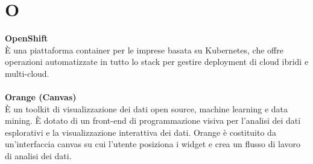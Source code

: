 \section{O}
\textbf{OpenShift}\\
È una piattaforma container per le imprese basata su Kubernetes, che offre operazioni automatizzate in tutto lo stack per gestire deployment di cloud ibridi e multi-cloud. \\ \\
\textbf{Orange (Canvas)}\\
È un toolkit di visualizzazione dei dati open source, machine learning e data mining. È dotato di un front-end di programmazione visiva per l'analisi dei dati esplorativi e la visualizzazione interattiva dei dati. Orange è costituito da un'interfaccia canvas su cui l'utente posiziona i widget e crea un flusso di lavoro di analisi dei dati. \\ \\
\clearpage
